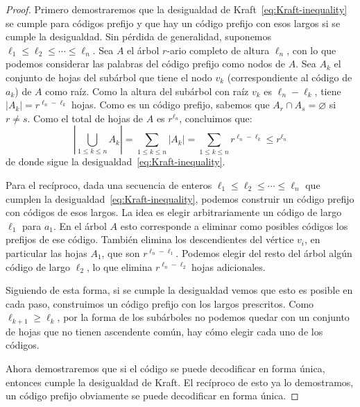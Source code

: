   \begin{proof}
    Primero demostraremos que la desigualdad de Kraft~\ref{eq:Kraft-inequality}
    se cumple para códigos prefijo
    y que hay un código prefijo con esos largos si se cumple la desigualdad.
    Sin pérdida de generalidad,
    suponemos \(\ell_1 \le \ell_2  \le \dotsb \le \ell_n\).
    Sea \(A\) el árbol \(r\)\nobreakdash-ario completo de altura \(\ell_n\),
    con lo que podemos considerar las palabras del código prefijo
    como nodos de \(A\).
    Sea \(A_k\) el conjunto de hojas del subárbol que tiene el nodo \(v_k\)
    (correspondiente al código de \(a_k\))
    de \(A\) como raíz.
    Como la altura del subárbol con raíz \(v_k\) es \(\ell_n - \ell_k\),
    tiene \(\lvert A_k \rvert = r^{\ell_n - \ell_k}\) hojas.
    Como es un código prefijo,
    sabemos que \(A_r \cap A_s = \varnothing\) si \(r \ne s\).
    Como el total de hojas de \(A\) es \(r^{\ell_n}\),
    concluimos que:
    \begin{equation*}
      \left\lvert \bigcup_{1 \le k \le n} A_k \right\rvert
        =   \sum_{1 \le k \le n} \lvert A_k \rvert
        =   \sum_{1 \le k \le n} r^{\ell_n - \ell_k}
        \le r^{\ell_n}
    \end{equation*}
    de donde sigue la desigualdad~\ref{eq:Kraft-inequality}.

    Para el recíproco,
    dada una secuencia de enteros \(\ell_1 \le \ell_2 \le \dotsb \le \ell_n\)
    que cumplen la desigualdad~\ref{eq:Kraft-inequality},
    podemos construir un código prefijo con códigos de esos largos.
    La idea es elegir arbitrariamente
    un código de largo \(\ell_1\) para \(a_1\).
    En el árbol \(A\)
    esto corresponde a eliminar como posibles códigos
    los prefijos de ese código.
    También elimina los descendientes del vértice \(v_i\),
    en particular las hojas \(A_1\),
    que son \(r^{\ell_n - \ell_1}\).
    Podemos elegir del resto del árbol algún código de largo \(\ell_2\),
    lo que elimina \(r^{\ell_n - \ell_2}\) hojas adicionales.

    Siguiendo de esta forma,
    si se cumple la desigualdad vemos que esto es posible en cada paso,
    construimos un código prefijo con los largos prescritos.
    Como \(\ell_{k + 1} \ge \ell_k\),
    por la forma de los subárboles
    no podemos quedar con un conjunto de hojas que no tienen ascendente común,
    hay cómo elegir cada uno de los códigos.

    Ahora demostraremos que si el código se puede decodificar en forma única,
    entonces cumple la desigualdad de Kraft.
    El recíproco de esto ya lo demostramos,
    un código prefijo obviamente se puede decodificar en forma única.


\end{proof}
